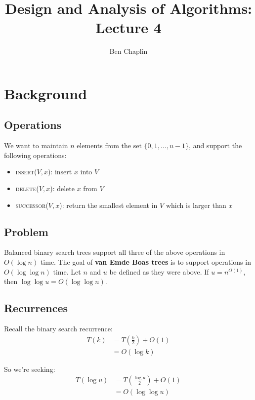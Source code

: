 \documentclass[11pt]{article}
\title{Design and Analysis of Algorithms: Lecture 4}
\author{Ben Chaplin}
\date{}
\theoremstyle{plain}
\theoremstyle{definition}
\begin{document}
\maketitle
\tableofcontents

\section{Background}
\subsection{Operations}

We want to maintain $n$ elements from the set $\{0, 1, \ldots, u - 1\}$, and support the following
operations:

\begin{itemize}
    \item \textsc{insert}($V, x$): insert $x$ into $V$
    \item \textsc{delete}($V, x$): delete $x$ from $V$
    \item \textsc{successor}($V, x$): return the smallest element in $V$ which is larger than $x$
\end{itemize}

\subsection{Problem}

Balanced binary search trees support all three of the above operations in $O(\log n)$ time. The 
goal of \textbf{van Emde Boas trees} is to support operations in $O(\log\log n)$ time.
\bigbreak
Let $n$ and $u$ be defined as they were above. If $u = n^{O(1)}$, then $\log\log u = O(\log\log n)$.

\subsection{Recurrences}

Recall the binary search recurrence:
\begin{align}
    T(k) &= T\left(\frac{k}{2}\right) + O(1)\\
         &= O(\log k)
\end{align}

So we're seeking:
\begin{align}
    T(\log u) &= T\left(\frac{\log u}{2}\right) + O(1)\\
              &= O(\log\log u)
\end{align}
\end{document}

